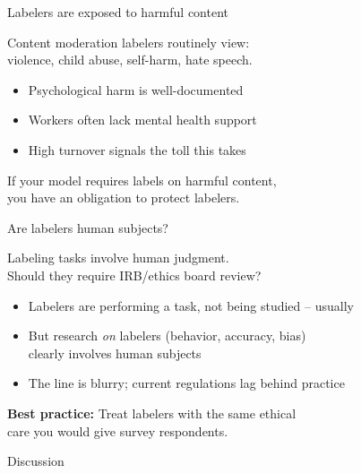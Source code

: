 \documentclass[aspectratio=169,11pt]{beamer}
\begin{document}
\begin{frame}{Labelers are exposed to harmful content}

Content moderation labelers routinely view:\\
violence, child abuse, self-harm, hate speech.

\vspace{1em}

\begin{itemize}
  \item Psychological harm is well-documented
  \item Workers often lack mental health support
  \item High turnover signals the toll this takes
\end{itemize}

\vspace{1em}

If your model requires labels on harmful content,\\
you have an obligation to protect labelers.
\end{frame}

\begin{frame}{Are labelers human subjects?}

Labeling tasks involve human judgment.\\
Should they require IRB/ethics board review?

\vspace{1em}

\begin{itemize}
  \item Labelers are performing a task, not being studied -- usually
  \item But research \textit{on} labelers (behavior, accuracy, bias)\\
        clearly involves human subjects
  \item The line is blurry; current regulations lag behind practice
\end{itemize}

\vspace{1em}

\textbf{Best practice:} Treat labelers with the same ethical\\
care you would give survey respondents.
\end{frame}

\begin{frame}[standout]
Discussion
\end{frame}
\end{document}

